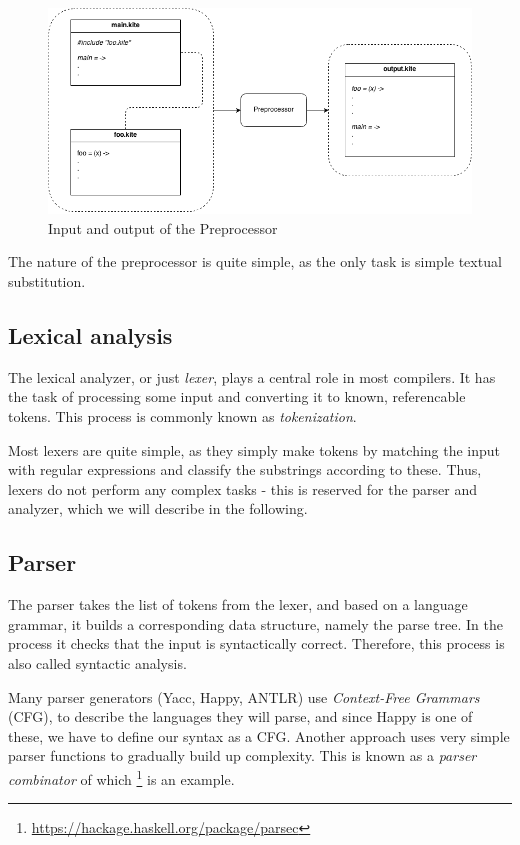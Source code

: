 \begin{figure}[H]
  \centering
  \includegraphics[scale=0.45]{images/preprocessor.png}
  \caption{Input and output of the Preprocessor}
\label{fig:preprocessor}
\end{figure}

The nature of the preprocessor is quite simple, as the only task is simple textual substitution.


\subsection{Lexical analysis}
The lexical analyzer, or just \emph{lexer}, plays a central role in most compilers. It has the task of processing some input and converting it to known, referencable tokens. This process is commonly known as \emph{tokenization}.

Most lexers are quite simple, as they simply make tokens by matching the input with regular expressions and classify the substrings according to these. Thus, lexers do not perform any complex tasks - this is reserved for the parser and analyzer, which we will describe in the following.


\subsection{Parser}
The parser takes the list of tokens from the lexer, and based on a language grammar, it builds a corresponding data structure, namely the parse tree. In the process it checks that the input is syntactically correct. Therefore, this process is also called syntactic analysis.

Many parser generators (Yacc, Happy, ANTLR) use \emph{Context-Free Grammars} (CFG), to describe the languages they will parse, and since Happy is one of these, we have to define our syntax as a CFG. Another approach uses very simple parser functions to gradually build up complexity. This is known as a \emph{parser combinator} of which \footnote{\url{https://hackage.haskell.org/package/parsec}} is an example.

